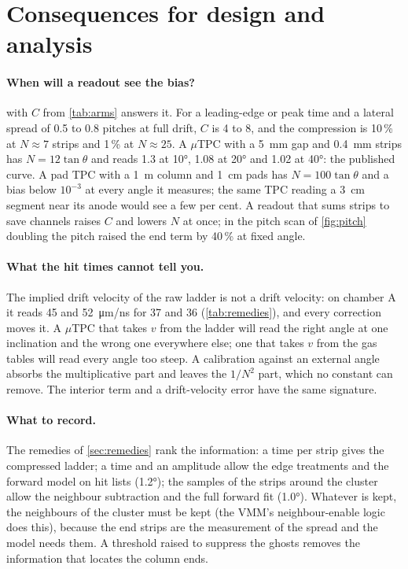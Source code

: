 \section{Consequences for design and analysis}\label{sec:guidance}

\paragraph{When will a readout see the bias?}  with $C$ from \cref{tab:arms} answers it. For a leading-edge
or peak time and a lateral spread of 0.5 to 0.8 pitches at full drift, $C$ is 4 to 8, and the compression is 10\,\% at
$N \approx 7$ strips and 1\,\% at $N \approx 25$. A $\mu$TPC with a 5~mm gap and \SI{0.4}{mm} strips has $N = 12\tan\theta$ and
reads 1.3 at \ang{10}, 1.08 at \ang{20} and 1.02 at \ang{40}: the published curve. A pad TPC with a 1~m column and 1~cm pads has
$N = 100\tan\theta$ and a bias below $10^{-3}$ at every angle it measures; the same TPC reading a 3~cm segment near its anode
would see a few per cent. A readout that sums strips to save channels raises $C$ and lowers $N$ at once; in the pitch scan of
\cref{fig:pitch} doubling the pitch raised the end term by 40\,\% at fixed angle.

\paragraph{What the hit times cannot tell you.} The implied drift velocity of the raw ladder is not a drift velocity: on
chamber A it reads 45 and \SI{52}{\micro\metre/ns} for 37 and 36 (\cref{tab:remedies}), and every correction moves it. A
$\mu$TPC that takes $v$ from the ladder will read the right angle at one inclination and the wrong one everywhere else; one
that takes $v$ from the gas tables will read every angle too steep. A calibration against an external angle absorbs the
multiplicative part and leaves the $1/N^2$ part, which no constant can remove. The interior term and a drift-velocity error
have the same signature.

\paragraph{What to record.} The remedies of \cref{sec:remedies} rank the information: a time per strip gives the
compressed ladder; a time and an amplitude allow the edge treatments and the forward model on hit lists (\ang{1.2}); the samples
of the strips around the cluster allow the neighbour subtraction and the full forward fit (\ang{1.0}). Whatever is kept, the
neighbours of the cluster must be kept (the VMM's neighbour-enable logic does this), because the end strips are the
measurement of the spread and the model needs them. A threshold raised to suppress the ghosts removes the information that
locates the column ends.

